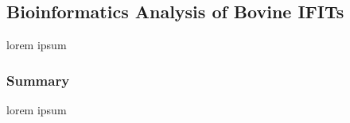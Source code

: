 \subsection{Bioinformatics Analysis of Bovine IFITs} \label{subsec:Bioinformatics Analysis of Bovine IFITs}
lorem ipsum



\subsubsection{Summary}
lorem ipsum